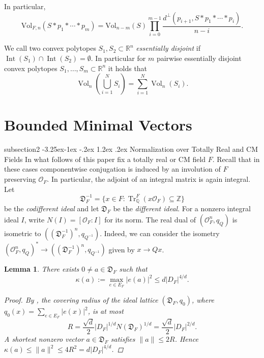 \documentclass[11pt,a4paper,twoside]{amsart}
\makeatletter
\renewcommand{\subsection}{\@startsection
  {subsection}{2}{\z@}%
  {-3.25ex\@plus -1ex \@minus -.2ex}%
  {1.2ex \@plus .2ex}%
  {\normalfont\bfseries}}
\theoremstyle{plain}
\newtheorem{lemma}[theorem]{\bfseries Lemma}
\theoremstyle{definition}
\newcommand{\rint}[0]{\mathcal{O}_F}
\newcommand{\disc}[0]{D_F}
\newcommand{\vol}[0]{\mathrm{Vol}}
\newcommand{\Diff}{\mathfrak D_F}
\newcommand{\Codiff}{\mathfrak D_F^{-1}}
\renewcommand{\leq}{\leqslant}
\makeatother
\begin{document}
In particular, 
\begin{equation}
    \label{volumen_k_join}
    \vol_{F,n}(S*p_1*\cdots*p_m) = \vol_{n-m}(S)\prod_{i = 0}^{m-1} \frac{d^{\perp}(p_{i+1}, S*p_1*\cdots*p_i)}{n-i}.
\end{equation}

We call two convex polytopes $S_1,S_2 \subset \mathbb{R}^n$ \textit{essentially
disjoint} if $\operatorname{Int}(S_1) \cap \operatorname{Int}(S_2) = \emptyset$.
In particular for $m$ pairwise essentially disjoint convex polytopes
$S_1,\ldots,S_m \subset \mathbb{R}^n$ it holds that
\begin{equation}
\label{essentially_disjoint}
      \operatorname{Vol}_n\left(\bigcup_{i=1}^N S_i\right)
    =
    \sum_{i=1}^N \operatorname{Vol}_n(S_i).  
\end{equation}

\section{Bounded Minimal Vectors}

\subsection{Normalization over Totally Real and CM Fields}
In what follows of this paper fix a totally real or CM field $F$. Recall that in these cases componentwise conjugation is induced by an involution of $F$ preserving $\rint$. In particular, the adjoint of an integral matrix is again integral. Let
$$\Codiff=\{x\in F:\operatorname{Tr}_\mathbb{Q}^F (x\rint)\subseteq\mathbb Z\}$$
be the \textit{codifferent ideal} and let $\Diff$ be the \textit{different ideal}. For a nonzero integral ideal $I$, write $N(I)=[\rint:I]$ for its norm. The real dual of $(\rint^n,q_Q)$ is isometric to $((\Codiff)^n,q_{Q^{-1}})$. Indeed,
we can consider the isometry $(\rint^n,q_Q)^* \to ((\Codiff)^n,q_{Q^{-1}})$ given by $x\to Qx$.

\begin{lemma}\label{short_different}
There exists $0\neq a\in\Diff$ such that
$$\kappa(a):=\max_{e\in E_F}|e(a)|^2\leq d|\disc|^{4/d}.$$
\begin{proof}
By \cite[Proposition~4.1]{emery}, the covering radius of the ideal lattice $(\Diff,q_0)$, where $q_0(x)=\sum_{e\in E_F}|e(x)|^2$, is at most
$$R=\frac{\sqrt d}{2}|\disc|^{1/d}N(\Diff)^{1/d}=\frac{\sqrt d}{2}|\disc|^{2/d}.$$
A shortest nonzero vector $a\in\Diff$ satisfies $\|a\|\leq2R$. Hence $\kappa(a)\leq\|a\|^2\leq4R^2=d|\disc|^{4/d}$.
\end{proof}
\end{lemma}
\end{document}
